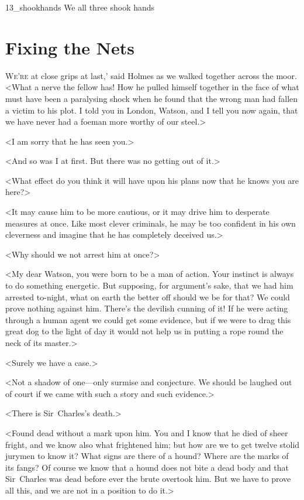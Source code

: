 
\begin{withfootnotes}
	\cleardoubleevenpage
	\begin{bwbigpic}
			[1.0] 
		{13_shookhands}
		{We all three shook hands}
	\end{bwbigpic}
\end{withfootnotes}

\chapter{Fixing the Nets}

\lettrine[ante=`]{W}{e're} at close grips at last,' said Holmes as we walked together across the moor. <What a nerve the fellow has! How he pulled himself together in the face of what must have been a paralysing shock when he found that the wrong man had fallen a victim to his plot. I told you in London, Watson, and I tell you now again, that we have never had a foeman more worthy of our steel.>

<I am sorry that he has seen you.>

<And so was I at first. But there was no getting out of it.>

<What effect do you think it will have upon his plans now that he knows you are here?>

<It may cause him to be more cautious, or it may drive him to desperate measures at once. Like most clever criminals, he may be too confident in his own cleverness and imagine that he has completely deceived us.>

<Why should we not arrest him at once?>

<My dear Watson, you were born to be a man of action. Your instinct is always to do something energetic. But supposing, for argument's sake, that we had him arrested to-night, what on earth the better off should we be for that? We could prove nothing against him. There's the devilish cunning of it! If he were acting through a human agent we could get some evidence, but if we were to drag this great dog to the light of day it would not help us in putting a rope round the neck of its master.>

<Surely we have a case.>

<Not a shadow of one—only surmise and conjecture. We should be laughed out of court if we came with such a story and such evidence.>

<There is Sir~Charles's death.>

<Found dead without a mark upon him. You and I know that he died of sheer fright, and we know also what frightened him; but how are we to get twelve stolid jurymen to know it? What signs are there of a hound? Where are the marks of its fangs? Of course we know that a hound does not bite a dead body and that Sir~Charles was dead before ever the brute overtook him. But we have to prove all this, and we are not in a position to do it.>


